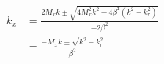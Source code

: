 





\begin{align*}
    k_x &= \frac{2M_x k \pm \sqrt{4 M_x^2 k^2 + 4 \beta^2 \left( k^2 - k_r^2 \right)}}{-2\beta^2}\\
        &= \frac{-M_x k \pm \sqrt{k^2 - k_r^2}}{\beta^2}
\end{align*}












